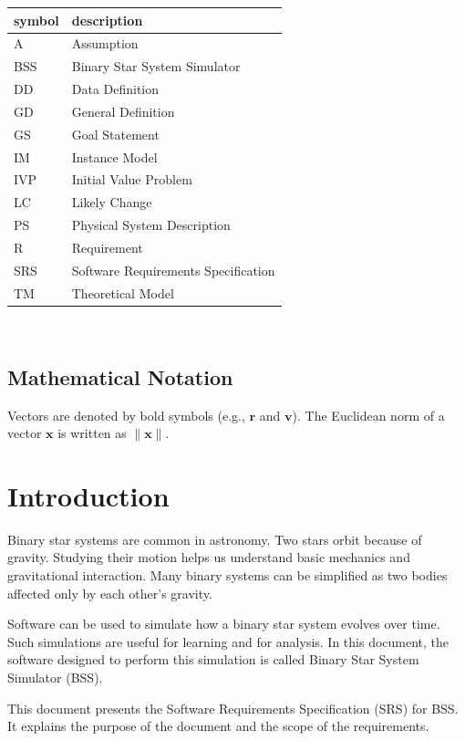 \documentclass[12pt]{article}
\begin{document}
\renewcommand{\arraystretch}{1.2}
\begin{tabular}{l l} 
  \toprule		
  \textbf{symbol} & \textbf{description}\\
  \midrule 
  A & Assumption\\
  BSS & Binary Star System Simulator\\
  DD & Data Definition\\
  GD & General Definition\\
  GS & Goal Statement\\
  IM & Instance Model\\
  IVP & Initial Value Problem\\
  LC & Likely Change\\
  PS & Physical System Description\\
  R & Requirement\\
  SRS & Software Requirements Specification\\
  TM & Theoretical Model\\
  \bottomrule
\end{tabular}\\

\subsection{Mathematical Notation}
Vectors are denoted by bold symbols (e.g., $\mathbf{r}$ and $\mathbf{v}$). The
Euclidean norm of a vector $\mathbf{x}$ is written as $\lVert \mathbf{x}
\rVert$.

\newpage
{}
\section{Introduction}

Binary star systems are common in astronomy. Two stars orbit because of gravity.
Studying their motion helps us understand basic mechanics and gravitational
interaction. Many binary systems can be simplified as two bodies affected only
by each other’s gravity.

Software can be used to simulate how a binary star system evolves over time.
Such simulations are useful for learning and for analysis. In this document, the
software designed to perform this simulation is called Binary Star System
Simulator (BSS).

This document presents the Software Requirements Specification (SRS) for BSS. It
explains the purpose of the document and the scope of the requirements.
\end{document}
